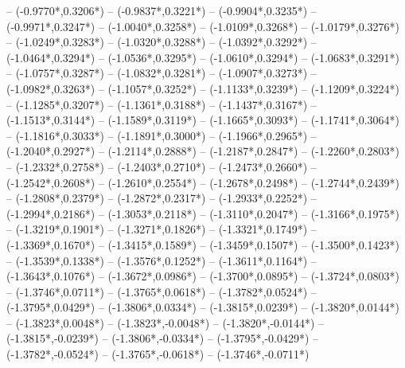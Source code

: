 {	-- ({-0.9770*\dx},{0.3206*\dy})
	-- ({-0.9837*\dx},{0.3221*\dy})
	-- ({-0.9904*\dx},{0.3235*\dy})
	-- ({-0.9971*\dx},{0.3247*\dy})
	-- ({-1.0040*\dx},{0.3258*\dy})
	-- ({-1.0109*\dx},{0.3268*\dy})
	-- ({-1.0179*\dx},{0.3276*\dy})
	-- ({-1.0249*\dx},{0.3283*\dy})
	-- ({-1.0320*\dx},{0.3288*\dy})
	-- ({-1.0392*\dx},{0.3292*\dy})
	-- ({-1.0464*\dx},{0.3294*\dy})
	-- ({-1.0536*\dx},{0.3295*\dy})
	-- ({-1.0610*\dx},{0.3294*\dy})
	-- ({-1.0683*\dx},{0.3291*\dy})
	-- ({-1.0757*\dx},{0.3287*\dy})
	-- ({-1.0832*\dx},{0.3281*\dy})
	-- ({-1.0907*\dx},{0.3273*\dy})
	-- ({-1.0982*\dx},{0.3263*\dy})
	-- ({-1.1057*\dx},{0.3252*\dy})
	-- ({-1.1133*\dx},{0.3239*\dy})
	-- ({-1.1209*\dx},{0.3224*\dy})
	-- ({-1.1285*\dx},{0.3207*\dy})
	-- ({-1.1361*\dx},{0.3188*\dy})
	-- ({-1.1437*\dx},{0.3167*\dy})
	-- ({-1.1513*\dx},{0.3144*\dy})
	-- ({-1.1589*\dx},{0.3119*\dy})
	-- ({-1.1665*\dx},{0.3093*\dy})
	-- ({-1.1741*\dx},{0.3064*\dy})
	-- ({-1.1816*\dx},{0.3033*\dy})
	-- ({-1.1891*\dx},{0.3000*\dy})
	-- ({-1.1966*\dx},{0.2965*\dy})
	-- ({-1.2040*\dx},{0.2927*\dy})
	-- ({-1.2114*\dx},{0.2888*\dy})
	-- ({-1.2187*\dx},{0.2847*\dy})
	-- ({-1.2260*\dx},{0.2803*\dy})
	-- ({-1.2332*\dx},{0.2758*\dy})
	-- ({-1.2403*\dx},{0.2710*\dy})
	-- ({-1.2473*\dx},{0.2660*\dy})
	-- ({-1.2542*\dx},{0.2608*\dy})
	-- ({-1.2610*\dx},{0.2554*\dy})
	-- ({-1.2678*\dx},{0.2498*\dy})
	-- ({-1.2744*\dx},{0.2439*\dy})
	-- ({-1.2808*\dx},{0.2379*\dy})
	-- ({-1.2872*\dx},{0.2317*\dy})
	-- ({-1.2933*\dx},{0.2252*\dy})
	-- ({-1.2994*\dx},{0.2186*\dy})
	-- ({-1.3053*\dx},{0.2118*\dy})
	-- ({-1.3110*\dx},{0.2047*\dy})
	-- ({-1.3166*\dx},{0.1975*\dy})
	-- ({-1.3219*\dx},{0.1901*\dy})
	-- ({-1.3271*\dx},{0.1826*\dy})
	-- ({-1.3321*\dx},{0.1749*\dy})
	-- ({-1.3369*\dx},{0.1670*\dy})
	-- ({-1.3415*\dx},{0.1589*\dy})
	-- ({-1.3459*\dx},{0.1507*\dy})
	-- ({-1.3500*\dx},{0.1423*\dy})
	-- ({-1.3539*\dx},{0.1338*\dy})
	-- ({-1.3576*\dx},{0.1252*\dy})
	-- ({-1.3611*\dx},{0.1164*\dy})
	-- ({-1.3643*\dx},{0.1076*\dy})
	-- ({-1.3672*\dx},{0.0986*\dy})
	-- ({-1.3700*\dx},{0.0895*\dy})
	-- ({-1.3724*\dx},{0.0803*\dy})
	-- ({-1.3746*\dx},{0.0711*\dy})
	-- ({-1.3765*\dx},{0.0618*\dy})
	-- ({-1.3782*\dx},{0.0524*\dy})
	-- ({-1.3795*\dx},{0.0429*\dy})
	-- ({-1.3806*\dx},{0.0334*\dy})
	-- ({-1.3815*\dx},{0.0239*\dy})
	-- ({-1.3820*\dx},{0.0144*\dy})
	-- ({-1.3823*\dx},{0.0048*\dy})
	-- ({-1.3823*\dx},{-0.0048*\dy})
	-- ({-1.3820*\dx},{-0.0144*\dy})
	-- ({-1.3815*\dx},{-0.0239*\dy})
	-- ({-1.3806*\dx},{-0.0334*\dy})
	-- ({-1.3795*\dx},{-0.0429*\dy})
	-- ({-1.3782*\dx},{-0.0524*\dy})
	-- ({-1.3765*\dx},{-0.0618*\dy})
	-- ({-1.3746*\dx},{-0.0711*\dy})
}
